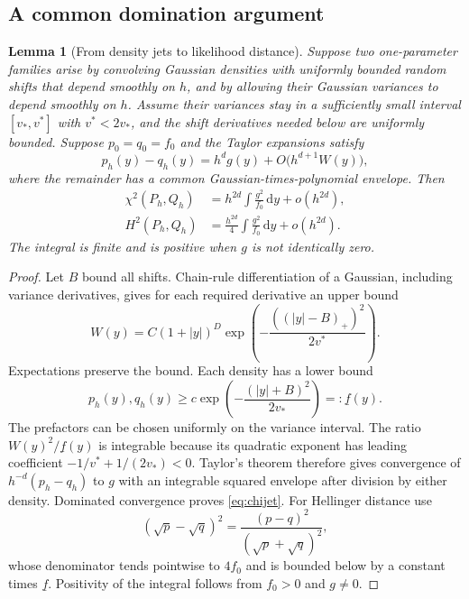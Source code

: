 \documentclass[11pt,a4paper]{article}
\numberwithin{equation}{section}
\newtheorem{lemma}[theorem]{Lemma}
\theoremstyle{definition}
\theoremstyle{remark}
\newcommand{\dd}{\,\mathrm d}
\begin{document}
\subsection{A common domination argument}
\begin{lemma}[From density jets to likelihood distance]
\label{lem:likelihood}
Suppose two one-parameter families arise by convolving Gaussian densities
with uniformly bounded random shifts that depend smoothly on $h$, and by
allowing their Gaussian variances to depend smoothly on $h$. Assume their
variances stay in a sufficiently small interval $[v_*,v^*]$ with
$v^*<2v_*$, and the shift derivatives needed below are uniformly bounded.
Suppose $p_0=q_0=f_0$ and the Taylor expansions satisfy
\begin{equation}
 p_h(y)-q_h(y)=h^d g(y)+O\bigl(h^{d+1}W(y)\bigr),
 \label{eq:densityjet}
\end{equation}
where the remainder has a common Gaussian-times-polynomial envelope.
Then
\begin{align}
 \chi^2(P_h,Q_h)&=h^{2d}\int\frac{g^2}{f_0}\dd y+o(h^{2d}),
 \label{eq:chijet}\\
 H^2(P_h,Q_h)&=\frac{h^{2d}}{4}\int\frac{g^2}{f_0}\dd y+o(h^{2d}).
 \label{eq:helljet}
\end{align}
The integral is finite and is positive when $g$ is not identically zero.
\end{lemma}
\begin{proof}
Let $B$ bound all shifts. Chain-rule differentiation of a Gaussian, including
variance derivatives, gives for each required derivative an upper bound
\begin{equation}
 W(y)=C(1+|y|)^D
  \exp\left(-\frac{((|y|-B)_+)^2}{2v^*}\right).
 \label{eq:upperenvelope}
\end{equation}
Expectations preserve the bound. Each density has a lower bound
\begin{equation}
 p_h(y),q_h(y)\ge c\exp\left(-\frac{(|y|+B)^2}{2v_*}\right)=:\underline f(y).
 \label{eq:lowerenvelope}
\end{equation}
The prefactors can be chosen uniformly on the variance interval.
The ratio $W(y)^2/\underline f(y)$ is integrable because its quadratic
exponent has leading coefficient $-1/v^*+1/(2v_*)<0$.
Taylor's theorem therefore gives convergence of
$h^{-d}(p_h-q_h)$ to $g$ with an integrable squared envelope after division
by either density. Dominated convergence proves \eqref{eq:chijet}.
For Hellinger distance use
\begin{equation}
 (\sqrt p-\sqrt q)^2=\frac{(p-q)^2}{(\sqrt p+\sqrt q)^2},
\end{equation}
whose denominator tends pointwise to $4f_0$ and is bounded below by a
constant times $\underline f$. Positivity of the integral follows from
$f_0>0$ and $g\ne0$.
\end{proof}
\end{document}
